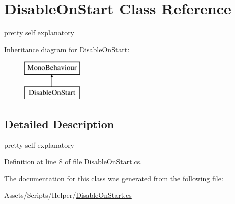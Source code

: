\hypertarget{class_disable_on_start}{}\section{Disable\+On\+Start Class Reference}
\label{class_disable_on_start}


pretty self explanatory  


Inheritance diagram for Disable\+On\+Start\+:\begin{figure}[H]
\begin{center}
\leavevmode
\includegraphics[height=2.000000cm]{class_disable_on_start}
\end{center}
\end{figure}


\subsection{Detailed Description}
pretty self explanatory 



Definition at line 8 of file Disable\+On\+Start.\+cs.



The documentation for this class was generated from the following file\+:\begin{DoxyCompactItemize}
\item 
Assets/\+Scripts/\+Helper/\mbox{\hyperlink{_disable_on_start_8cs}{Disable\+On\+Start.\+cs}}\end{DoxyCompactItemize}

